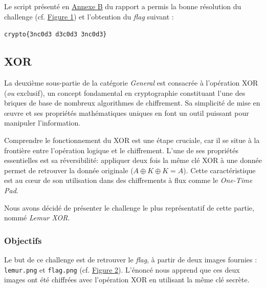 Le script présenté en \hyperref[annexe:script-res-encoding]{Annexe B} du rapport a permis la bonne résolution du challenge
(cf. \hyperref[fig:encodeChall]{Figure 1}) et l'obtention du \textit{flag} suivant :

\begin{center}
    \texttt{crypto\{3nc0d3\ d3c0d3\ 3nc0d3\}}
\end{center}

\subsection{XOR}

La deuxième sous-partie de la catégorie \textit{General} est consacrée à
l'opération XOR (\textit{ou} exclusif), un concept fondamental en cryptographie
constituant l'une des briques de base de nombreux algorithmes de
chiffrement. Sa simplicité de mise en œuvre et ses propriétés
mathématiques uniques en font un outil puissant pour manipuler
l'information.

Comprendre le fonctionnement du XOR est une étape cruciale, car il se
situe à la frontière entre l'opération logique et le chiffrement. L'une
de ses propriétés essentielles est sa réversibilité: appliquer deux fois
la même clé XOR à une donnée permet de retrouver la donnée originale
($A \oplus K \oplus K = A$). Cette caractéristique est au cœur de son
utilisation dans des chiffrements à flux comme le \textit{One-Time Pad}.

Nous avons décidé de présenter le challenge le plus représentatif de
cette partie, nommé \textit{Lemur XOR}.

\subsubsection{Objectifs}
Le but de ce challenge est de retrouver le \textit{flag}, à partir de
deux images fournies : \texttt{lemur.png} et \texttt{flag.png} (cf. \hyperref[fig:lemurChall]{Figure 2}). L'énoncé
nous apprend que ces deux images ont été chiffrées avec l'opération XOR en
utilisant la même clé secrète.

